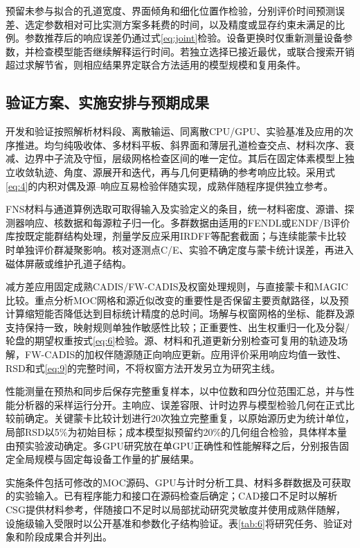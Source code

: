 \documentclass[UTF8, zihao=-4, fontset=none, a4paper]{ctexart}
\begin{document}
预留未参与拟合的孔道宽度、界面倾角和细化位置作检验，分别评价时间预测误差、选定参数相对可比实测方案多耗费的时间，以及精度或显存约束未满足的比例。参数推荐后的响应误差仍通过式\eqref{eq:joint}检验。设备更换时仅重新测量设备参数，并检查模型能否继续解释运行时间。若独立选择已接近最优，或联合搜索开销超过求解节省，则相应结果界定联合方法适用的模型规模和复用条件。

\subsection{验证方案、实施安排与预期成果}

开发和验证按照解析材料段、离散输运、同离散CPU/GPU、实验基准及应用的次序推进。均匀纯吸收体、多材料平板、斜界面和薄层孔道检查交点、材料次序、衰减、边界中子流及守恒，层级网格检查区间的唯一定位。其后在固定体素模型上独立收敛轨迹、角度、源展开和迭代，再与几何更精确的参考响应比较。采用式\eqref{eq:4}的内积对偶及源--响应互易检验伴随实现，成熟伴随程序提供独立参考。

FNS材料与通道算例选取可取得输入及实验定义的条目，统一材料密度、源谱、探测器响应、核数据和每源粒子归一化。多群数据由适用的FENDL或ENDF/B评价库按既定能群结构处理，剂量学反应采用IRDFF等配套截面；与连续能蒙卡比较时单独评价群凝聚影响。核对逐测点C/E、实验不确定度与蒙卡统计误差，再进入磁体屏蔽或维护孔道子结构。

减方差应用固定成熟CADIS/FW-CADIS及权窗处理规则，与直接蒙卡和MAGIC比较。重点分析MOC网格和源近似改变的重要性是否保留主要贡献路径，以及预计算缩短能否降低达到目标统计精度的总时间。场解与权窗网格的坐标、能群及源支持保持一致，映射规则单独作敏感性比较；正重要性、出生权重归一化及分裂/轮盘的期望权重按式\eqref{eq:6}检验。源、材料和孔道更新分别检查可复用的轨迹及场解，FW-CADIS的加权伴随源随正向响应更新。应用评价采用响应均值一致性、RSD和式\eqref{eq:9}的完整时间，不将权窗方法开发另立为研究主线。

性能测量在预热和同步后保存完整重复样本，以中位数和四分位范围汇总，并与性能分析器的采样运行分开。主响应、误差容限、计时边界与模型检验几何在正式比较前确定。关键蒙卡比较计划进行20次独立完整重复，以原始源历史为统计单位，局部RSD以5\%为初始目标；成本模型拟预留约20\%的几何组合检验，具体样本量由预实验波动确定。多GPU研究放在单GPU正确性和性能解释之后，分别报告固定全局规模与固定每设备工作量的扩展结果。

实施条件包括可修改的MOC源码、GPU与计时分析工具、材料多群数据及可获取的实验输入。已有程序能力和接口在源码检查后确定；CAD接口不足时以解析CSG提供材料参考，伴随接口不足时以局部扰动研究灵敏度并使用成熟伴随解，设施级输入受限时以公开基准和参数化子结构验证。表\ref{tab:6}将研究任务、验证对象和阶段成果合并列出。
\end{document}
